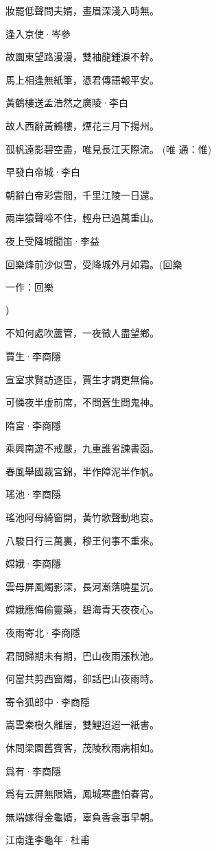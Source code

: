 \documentclass[12pt,a4paper]{ctexbook}
\begin{document}
妝罷低聲問夫婿，畫眉深淺入時無。\par
逢入京使·岑參\par
故園東望路漫漫，雙袖龍鍾淚不幹。\par
馬上相逢無紙筆，憑君傳語報平安。\par
黃鶴樓送孟浩然之廣陵·李白\par
故人西辭黃鶴樓，煙花三月下揚州。\par
孤帆遠影碧空盡，唯見長江天際流。 (唯 通：惟)\par
早發白帝城·李白\par
朝辭白帝彩雲間，千里江陵一日還。\par
兩岸猿聲啼不住，輕舟已過萬重山。\par
夜上受降城聞笛·李益\par
回樂烽前沙似雪，受降城外月如霜。(回樂\par
一作：回樂\par
）\par
不知何處吹蘆管，一夜徵人盡望鄉。\par
賈生·李商隱\par
宣室求賢訪逐臣，賈生才調更無倫。\par
可憐夜半虛前席，不問蒼生問鬼神。\par
隋宮·李商隱\par
乘興南遊不戒嚴，九重誰省諫書函。\par
春風舉國裁宮錦，半作障泥半作帆。\par
瑤池·李商隱\par
瑤池阿母綺窗開，黃竹歌聲動地哀。\par
八駿日行三萬裏，穆王何事不重來。\par
嫦娥·李商隱\par
雲母屏風燭影深，長河漸落曉星沉。\par
嫦娥應悔偷靈藥，碧海青天夜夜心。\par
夜雨寄北·李商隱\par
君問歸期未有期，巴山夜雨漲秋池。\par
何當共剪西窗燭，卻話巴山夜雨時。\par
寄令狐郎中·李商隱\par
嵩雲秦樹久離居，雙鯉迢迢一紙書。\par
休問梁園舊賓客，茂陵秋雨病相如。\par
爲有·李商隱\par
爲有云屏無限嬌，鳳城寒盡怕春宵。\par
無端嫁得金龜婿，辜負香衾事早朝。\par
江南逢李龜年·杜甫\par
\end{document}
